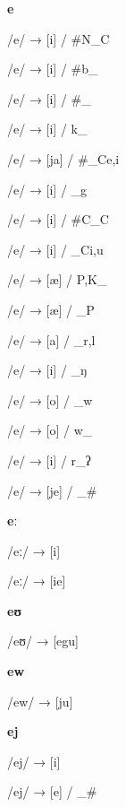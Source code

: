 \begin{center}\textbf{e}\end{center}
\begin{multicols}{4}
\noindent /e/ → [i] / \#N\_C

\noindent /e/ → [i] / \#b\_

\noindent /e/ → [i] / \#\_

\noindent /e/ → [i] / k\_

\noindent /e/ → [ja] / \#\_C{e,i}

\noindent /e/ → [i] / \_g

\noindent /e/ → [i] / \#C\_C

\noindent /e/ → [i] / \_C{i,u}

\noindent /e/ → [æ] / {P,K}\_

\noindent /e/ → [æ] / \_P

\noindent /e/ → [a] / \_{r,l}

\noindent /e/ → [i] / \_ŋ

\noindent /e/ → [o] / \_w

\noindent /e/ → [o] / w\_

\noindent /e/ → [i] / r\_ʔ

\noindent /e/ → [je] / \_\#

\end{multicols}

\begin{center}\textbf{eː}\end{center}
\begin{multicols}{4}
\noindent /eː/ → [i]

\noindent /eː/ → [ie]

\end{multicols}

\begin{center}\textbf{eʊ}\end{center}
\begin{multicols}{4}
\noindent /eʊ/ → [egu]

\end{multicols}

\begin{center}\textbf{ew}\end{center}
\begin{multicols}{4}
\noindent /ew/ → [ju]

\end{multicols}

\begin{center}\textbf{ej}\end{center}
\begin{multicols}{4}
\noindent /ej/ → [i]

\noindent /ej/ → [e] / \_\#

\end{multicols}

